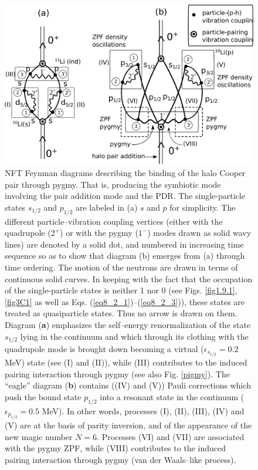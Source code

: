 \begin{subappendices}
   \begin{figure}
   \centerline{\includegraphics*[width=17cm,angle=0]{nutshell/figs/VdW.pdf}}\caption{NFT Feynman diagrams describing the binding of the halo Cooper pair through pygmy. That is, producing the symbiotic mode involving the pair addition mode and the PDR. The single-particle states $s_{1/2}$ and $p_{1/2}$ are labeled in (a) $s$ and $p$ for simplicity. The different particle--vibration coupling vertices (either with the quadrupole ($2^+$) or with the pygmy ($1^-$) modes drawn as solid wavy lines) are denoted by a solid dot, and numbered in increasing time sequence so as to show that diagram (b) emerges from (a) through time ordering. The motion of the neutrons are drawn in terms of continuous solid curves. In keeping with the fact that the occupation of the single-particle states is neither 1 nor 0 (see Figs. \ref{fig1.9.1}, \ref{fig3C1} as well as  Eqs. (\ref{eq8_2_1})--(\ref{eq8_2_3})), these states are treated as quasiparticle states. Thus no arrow is drawn on them. Diagram (\textbf{a}) emphasizes the self--energy renormalization of the state $s_{1/2}$ lying in the continuum and which   through its clothing with the quadrupole mode is brought down becoming a virtual ($\epsilon_{s_{1/2}}=0.2$ MeV) state (see (I) and (II)), while (III) contributes to the induced pairing interaction through pygmy (see also Fig. \ref{pigmy}). The ``eagle'' diagram (\textbf{b}) contains ((IV) and (V)) Pauli corrections which push the bound state $p_{1/2}$ into a resonant state in the continuum ($\epsilon_{p_{1/2}}=0.5$ MeV). In other words, processes (I), (II), (III), (IV) and (V) are at the basis of parity inversion, and of the appearance of the new magic number $N=6$. Processes (VI) and (VII) are associated with the pygmy ZPF, while (VIII) contributes to the induced pairing interaction through pygmy (van der Waals--like process).}\label{fig2.A.1}
   \end{figure}
 

\end{subappendices}
